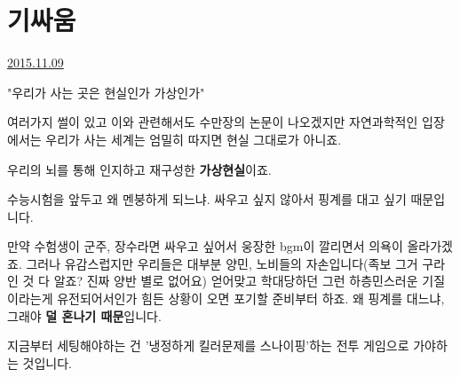 \section{기싸움}
\href{https://www.kockoc.com/Apoc/470657}{2015.11.09}

\vspace{5mm}

"우리가 사는 곳은 현실인가 가상인가"
\vspace{5mm}

여러가지 썰이 있고 이와 관련해서도 수만장의 논문이 나오겠지만
자연과학적인 입장에서는
우리가 사는 세계는 엄밀히 따지면 현실 그대로가 아니죠.
\vspace{5mm}

우리의 뇌를 통해 인지하고 재구성한 \textbf{가상현실}이죠.
\vspace{5mm}

수능시험을 앞두고 왜 멘붕하게 되느냐.
싸우고 싶지 않아서 핑계를 대고 싶기 때문입니다.
\vspace{5mm}

만약 수험생이 군주, 장수라면 싸우고 싶어서 웅장한 bgm이 깔리면서 의욕이 올라가겠죠.
그러나 유감스럽지만 우리들은 대부분 양민, 노비들의 자손입니다(족보 그거 구라인 것 다 알죠? 진짜 양반 별로 없어요)
얻어맞고 학대당하던 그런 하층민스러운 기질이라는게 유전되어서인가 힘든 상황이 오면 포기할 준비부터 하죠.
왜 핑계를 대느냐, 그래야 \textbf{덜 혼나기 때문}입니다.
\vspace{5mm}

지금부터 세팅해야하는 건 '냉정하게 킬러문제를 스나이핑'하는 전투 게임으로 가야하는 것입니다.
\vspace{5mm}

